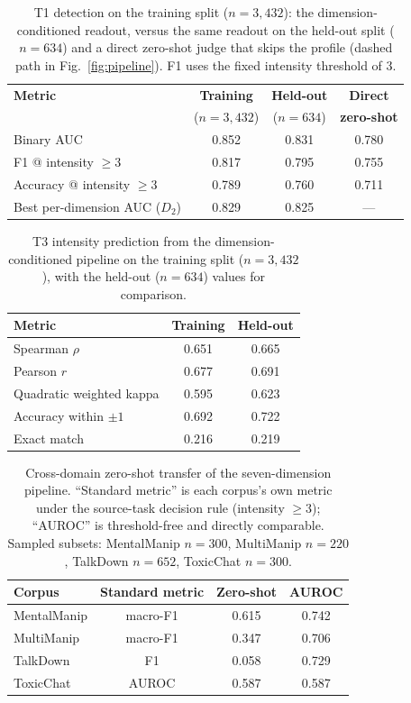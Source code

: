 \documentclass[conference]{IEEEtran}
\begin{document}
\begin{table}[t]
\centering
\caption{T1 detection on the training split ($n{=}3{,}432$): the
dimension-conditioned readout, versus the same readout on the held-out
split ($n{=}634$) and a direct zero-shot judge that skips the profile
(dashed path in Fig.~\ref{fig:pipeline}). F1 uses the fixed intensity
threshold of 3.}
\label{tab:results-t1}
\footnotesize
\begin{tabular}{@{}lccc@{}}
\toprule
\textbf{Metric} & \textbf{Training} & \textbf{Held-out} & \textbf{Direct}\\
 & ($n{=}3{,}432$) & ($n{=}634$) & \textbf{zero-shot}\\
\midrule
Binary AUC & 0.852 & 0.831 & 0.780\\
F1 @ intensity $\geq 3$ & 0.817 & 0.795 & 0.755\\
Accuracy @ intensity $\geq 3$ & 0.789 & 0.760 & 0.711\\
\midrule
Best per-dimension AUC ($D_2$) & 0.829 & 0.825 & ---\\
\bottomrule
\end{tabular}
\end{table}

\begin{table}[t]
\centering
\caption{T3 intensity prediction from the dimension-conditioned pipeline on
the training split ($n{=}3{,}432$), with the held-out ($n{=}634$) values
for comparison.}
\label{tab:results-t23}
\footnotesize
\begin{tabular}{@{}lcc@{}}
\toprule
\textbf{Metric} & \textbf{Training} & \textbf{Held-out}\\
\midrule
Spearman $\rho$ & 0.651 & 0.665\\
Pearson $r$ & 0.677 & 0.691\\
Quadratic weighted kappa & 0.595 & 0.623\\
Accuracy within $\pm 1$ & 0.692 & 0.722\\
Exact match & 0.216 & 0.219\\
\bottomrule
\end{tabular}
\end{table}

\begin{table}[t]
\centering
\caption{Cross-domain zero-shot transfer of the seven-dimension pipeline.
``Standard metric'' is each corpus's own metric under the source-task
decision rule (intensity ${\ge}3$); ``AUROC'' is threshold-free and directly
comparable. Sampled subsets: MentalManip $n{=}300$, MultiManip $n{=}220$,
TalkDown $n{=}652$, ToxicChat $n{=}300$.}
\label{tab:results-x}
\footnotesize
\begin{tabular}{@{}lccc@{}}
\toprule
\textbf{Corpus} & \textbf{Standard metric} & \textbf{Zero-shot} & \textbf{AUROC}\\
\midrule
MentalManip & macro-F1 & 0.615 & 0.742\\
MultiManip & macro-F1 & 0.347 & 0.706\\
TalkDown & F1 & 0.058 & 0.729\\
ToxicChat & AUROC & 0.587 & 0.587\\
\bottomrule
\end{tabular}
\end{table}
\end{document}
